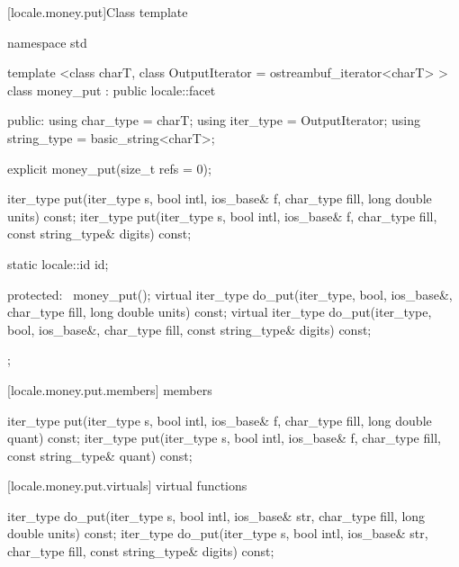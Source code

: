 [locale.money.put]{Class template }

%
\begin{codeblock}
namespace std {
  template <class charT,
    class OutputIterator = ostreambuf_iterator<charT> >
  class money_put : public locale::facet {
  public:
    using char_type   = charT;
    using iter_type   = OutputIterator;
    using string_type = basic_string<charT>;

    explicit money_put(size_t refs = 0);

    iter_type put(iter_type s, bool intl, ios_base& f,
                  char_type fill, long double units) const;
    iter_type put(iter_type s, bool intl, ios_base& f,
                  char_type fill, const string_type& digits) const;

    static locale::id id;

  protected:
    ~money_put();
    virtual iter_type do_put(iter_type, bool, ios_base&, char_type fill,
                             long double units) const;
    virtual iter_type do_put(iter_type, bool, ios_base&, char_type fill,
                             const string_type& digits) const;
  };
}
\end{codeblock}

[locale.money.put.members]{ members}

%
\begin{itemdecl}
iter_type put(iter_type s, bool intl, ios_base& f, char_type fill,
              long double quant) const;
iter_type put(iter_type s, bool intl, ios_base& f, char_type fill,
              const string_type& quant) const;
\end{itemdecl}

\begin{itemdescr}
\pnum
\returns
{}
\end{itemdescr}

[locale.money.put.virtuals]{ virtual functions}

%
\begin{itemdecl}
iter_type do_put(iter_type s, bool intl, ios_base& str,
                 char_type fill, long double units) const;
iter_type do_put(iter_type s, bool intl, ios_base& str,
                 char_type fill, const string_type& digits) const;
\end{itemdecl}


